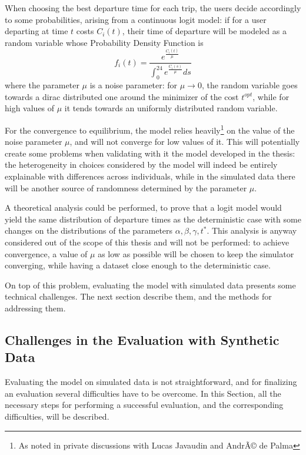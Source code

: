 When choosing the best departure time for each trip,
the users decide accordingly to some probabilities, arising from a continuous logit model:
if for a user departing at time \(t\) costs \(C_i(t)\),
their time of departure will be modeled as a random variable whose Probability Density Function is
\begin{equation}
  \label{eq:cost_logit}
  f_i(t) = \frac{e^{\frac{C_i(t)}{\mu}}}{\int_0^{24}e^{\frac{C_i(s)}{\mu}}ds}
\end{equation}
where the parameter \(\mu\) is a noise parameter:
for \(\mu \rightarrow 0\), the random variable goes towards a dirac distributed one around the minimizer of the cost \(t^{opt}\),
while for high values of \(\mu\) it tends towards an uniformly distributed random variable.

For the convergence to equilibrium, the model relies heavily\footnote{As noted in private discussions with Lucas Javaudin and AndrÃ© de Palma} on the value of the noise parameter \(\mu\),
and will not converge for low values of it.
This will potentially create some problems when validating with it the model developed in the thesis:
the heterogeneity in choices considered by the model will indeed be entirely explainable with differences across individuals,
while in the simulated data there will be another source of randomness determined by the parameter \(\mu\).

A theoretical analysis could be performed,
to prove that a logit model would yield the same distribution of departure times as the deterministic case with some changes on the distributions of the parameters \(\alpha, \beta, \gamma, t^*\).
This analysis is anyway considered out of the scope of this thesis and will not be performed:
to achieve convergence,
a value of \(\mu\) as low as possible will be chosen to keep the simulator converging,
while having a dataset close enough to the deterministic case.

On top of this problem, evaluating the model with simulated data presents some technical challenges.
The next section describe them, and the methods for addressing them.

\subsection{Challenges in the Evaluation with Synthetic Data}
\label{sec:sim_tech}

Evaluating the model on simulated data is not straightforward,
and for finalizing an evaluation several difficulties have to be overcome.
In this Section, all the necessary steps for performing a successful evaluation,
and the corresponding difficulties, will be described.

